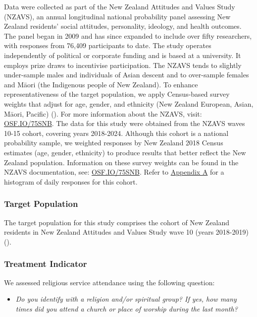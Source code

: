 \documentclass[
  single column]{article}
\providecommand{\tightlist}{%
  \setlength{\itemsep}{0pt}\setlength{\parskip}{0pt}}\usepackage{longtable,booktabs,array}
\begin{document}
Data were collected as part of the New Zealand Attitudes and Values
Study (NZAVS), an annual longitudinal national probability panel
assessing New Zealand residents' social attitudes, personality,
ideology, and health outcomes. The panel began in 2009 and has since
expanded to include over fifty researchers, with responses from 76,409
participants to date. The study operates independently of political or
corporate funding and is based at a university. It employs prize draws
to incentivise participation. The NZAVS tends to slightly under-sample
males and individuals of Asian descent and to over-sample females and
Māori (the Indigenous people of New Zealand). To enhance
representativeness of the target population, we apply Census-based
survey weights that adjust for age, gender, and ethnicity (New Zealand
European, Asian, Māori, Pacific) (). For more information about the NZAVS, visit:
\href{https://doi.org/10.17605/OSF.IO/75SNB}{OSF.IO/75SNB}. The data for
this study were obtained from the NZAVS waves 10-15 cohort, covering
years 2018-2024. Although this cohort is a national probability sample,
we weighted responses by New Zealand 2018 Census estimates (age, gender,
ethnicity) to produce results that better reflect the New Zealand
population. Information on these survey weights can be found in the
NZAVS documentation, see:
\href{https://doi.org/10.17605/OSF.IO/75SNB}{OSF.IO/75SNB}. Refer to
\hyperref[appendix-timeline]{Appendix A} for a histogram of daily
responses for this cohort.

\subsubsection{Target Population}\label{target-population}

The target population for this study comprises the cohort of New Zealand
residents in New Zealand Attitudes and Values Study wave 10 (years
2018-2019) ().

\subsubsection{Treatment Indicator}\label{treatment-indicator}

We assessed religious service attendance using the following question:

\begin{itemize}
\tightlist
\item
  \emph{Do you identify with a religion and/or spiritual group? If yes,
  how many times did you attend a church or place of worship during the
  last month?}
\end{itemize}
\end{document}
